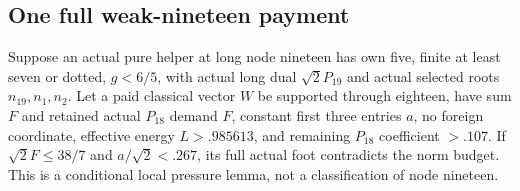 \subsection{One full weak-nineteen payment}
\label{app:tail:weak19}
\begin{lemma}
\label{app:tail:lem:weak19packet}
Suppose an actual pure helper at long node nineteen has own five,
finite at least seven or dotted, $g<6/5$, with actual long dual
$\sqrt2P_{19}$ and actual selected roots $n_{19},n_1,n_2$.
Let a paid classical vector $W$ be supported through eighteen, have
sum $F$ and retained actual $P_{18}$ demand $F$, constant first
three entries $a$, no foreign coordinate,
effective energy $L>.985613$, and remaining $P_{18}$ coefficient
$>.107$. If $\sqrt2F\le38/7$ and $a/\sqrt2<.267$, its full actual
foot contradicts the norm budget. This is a conditional local
pressure lemma, not a classification of node nineteen.
\end{lemma}
